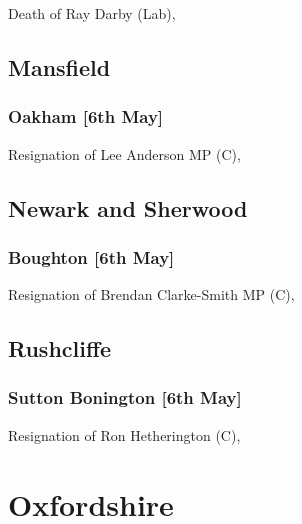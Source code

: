 \documentclass[a4paper,openany]{book}
\begin{document}
\begin{resultsiii}
Death of Ray Darby (Lab),

\subsection*{Mansfield}

\subsubsection*{Oakham \hspace*{\fill}\nolinebreak[1]%
	\enspace\hspace*{\fill}
	[6th May]}


Resignation of Lee Anderson MP (C),

\subsection*{Newark and Sherwood}

\subsubsection*{Boughton \hspace*{\fill}\nolinebreak[1]%
	\enspace\hspace*{\fill}
	[6th May]}


Resignation of Brendan Clarke-Smith MP (C),

\subsection*{Rushcliffe}

\subsubsection*{Sutton Bonington \hspace*{\fill}\nolinebreak[1]%
	\enspace\hspace*{\fill}
	[6th May]}


Resignation of Ron Hetherington (C),

\section{Oxfordshire}


\end{resultsiii}
\end{document}
